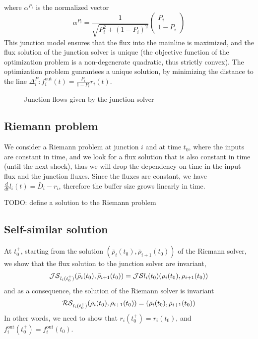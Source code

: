 where $\alpha^{P_i}$ is the normalized vector
\[
\alpha^{P_i} = \frac{1}{\sqrt{P_i^2 + (1-P_i)^2}} \left(\begin{array}{c} P_i \\ 1-P_i\end{array}\right)
\]
This junction model ensures that the flux into the mainline is maximized, and the flux solution of the junction solver is unique (the objective function of the optimization problem is a non-degenerate quadratic, thus strictly convex). The optimization problem guarantees a unique solution, by minimizing the distance to the line $\Delta_i^{P}: f_i^{\text{out}}(t) = \frac{P_i}{1-P_i} r_i(t)$.

\begin{figure}[h]
\centering
{}
\caption{Junction flows given by the junction solver}
\label{fig:junctionFlows}
\end{figure}

\subsection{Riemann problem}

We consider a Riemann problem at junction $i$ and at time $t_0$, where the inputs are constant in time, and we look for a flux solution that is also constant in time (until the next shock), thus we will drop the dependency on time in the input flux and the junction fluxes. Since the fluxes are constant, we have $\frac{d}{dt} l_i(t) = \bar{D}_i - r_i$, therefore the buffer size grows linearly in time.


TODO: define a solution to the Riemann problem

\subsection{Self-similar solution}

At $t_0^+$, starting from the solution $(\bar{\rho}_i(t_0), \bar{\rho}_{i+1}(t_0))$ of the Riemann solver, we show that the flux solution to the junction solver are invariant,
\[
\mathcal{JS}_{l_i(t_0^+)}(\bar{\rho}_i(t_0), \bar{\rho}_{i+1}(t_0)) = \mathcal{JS}{l_i(t_0)}(\rho_i(t_0), \rho_{i+1}(t_0))
\]
and as a consequence, the solution of the Riemann solver is invariant
\[
\mathcal{RS}_{l_i(t_0^+)} (\bar{\rho}_i(t_0), \bar{\rho}_{i+1}(t_0)) = (\bar{\rho_i}(t_0), \bar{\rho}_{i+1}(t_0))
\]
In other words, we need to show that $r_i(t_0^+) = r_i(t_0)$, and $f_i^{\text{out}}(t_0^+) = f_i^{\text{out}}(t_0)$.


